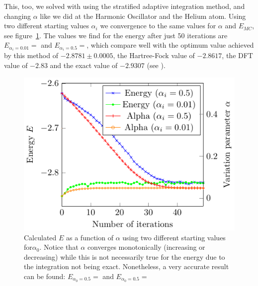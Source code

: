 This, too, we solved with using the stratified adaptive integration method, and changing $\alpha$ like we did at the Harmonic Oscillator and the Helium atom. Using two different starting values $\alpha_i$ we convergence to the same values for $\alpha$ and $E_{MC}$, see figure~\ref{fig:He_it}. The values we find for the energy after just 50 iterations are $E_{\alpha_i = 0.01} =  $ and $E_{\alpha_i = 0.5} =  $, which compare well with the optimum value achieved by this method of $-2.8781 \pm 0.0005$, the Hartree-Fock value of $-2.8617$, the DFT value of $-2.83$ and the exact value of $-2.9307$ (see \cite{JosBook}). %

\begin{figure}
  \begin{center}
  \includegraphics[scale=1 ]{graphs/he-e-alpha-iterations.pdf}
  \caption{
  	Calculated $E$ as a function of $\alpha$ using two different starting values for$\alpha_0$. Notice that $\alpha$ converges monotonically (increasing or decreasing) while this is not necessarily true for the energy due to the integration not being exact. Nonetheless, a very accurate result can be found: $E_{\alpha_0 = 0.5} =  $ and $E_{\alpha_0 = 0.5} =  $
  	}
  \label{fig:He_it}
  \end{center}
\end{figure}
 
